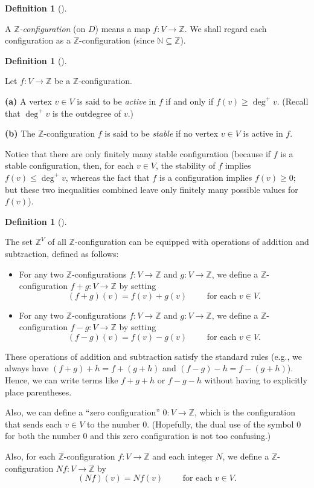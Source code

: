 \documentclass[numbers=enddot,12pt,final,onecolumn,notitlepage]{scrartcl}%
\theoremstyle{definition}
\newtheorem{defi}[theo]{Definition}
\newenvironment{definition}[1][]
{\begin{defi}[#1]\begin{leftbar}}
{\end{leftbar}\end{defi}}
\newcommand{\NN}{\mathbb{N}}
\newcommand{\ZZ}{\mathbb{Z}}
\newcommand{\tup}[1]{\left( #1 \right)}
\begin{document}
\begin{definition}
A \textit{$\ZZ$-configuration} (on $D$) means a map
$f : V \to \ZZ$.
We shall regard each configuration as a $\ZZ$-configuration
(since $\NN \subseteq \ZZ$).
\end{definition}

\begin{definition}
Let $f : V \to \ZZ$ be a $\ZZ$-configuration.

\textbf{(a)} A vertex $v \in V$ is said to be
\textit{active} in $f$ if and only if
$f\tup{v} \geq \deg^+ v$.
(Recall that $\deg^+ v$ is the outdegree of $v$.)

\textbf{(b)} The $\ZZ$-configuration $f$ is said to be
\textit{stable} if no vertex $v \in V$ is active in $f$.
\end{definition}

Notice that there are only finitely many stable configuration
(because if $f$ is a stable configuration, then, for each
$v \in V$, the stability of $f$ implies $f \tup{v} \leq \deg^+ v$,
whereas the fact that $f$ is a configuration implies
$f \tup{v} \geq 0$; but these two inequalities combined
leave only finitely many possible values for $f \tup{v}$).

\begin{definition} \label{def.chip.add-configs}
The set $\ZZ^V$ of all $\ZZ$-configuration can be equipped with
operations of addition and subtraction, defined as follows:

\begin{itemize}
 \item For any two $\ZZ$-configurations $f : V \to \ZZ$ and
       $g : V \to \ZZ$, we define a $\ZZ$-configuration
       $f + g : V \to \ZZ$ by setting
       \[
        \tup{f + g} \tup{v}
        = f \tup{v} + g \tup{v}
        \qquad \text{ for each } v \in V .
       \]

 \item For any two $\ZZ$-configurations $f : V \to \ZZ$ and
       $g : V \to \ZZ$, we define a $\ZZ$-configuration
       $f - g : V \to \ZZ$ by setting
       \[
        \tup{f - g} \tup{v}
        = f \tup{v} - g \tup{v}
        \qquad \text{ for each } v \in V .
       \]
\end{itemize}

These operations of addition and subtraction satisfy the
standard rules (e.g., we always have
$\tup{f+g} + h = f + \tup{g+h}$ and
$\tup{f-g} - h = f - \tup{g+h}$).
Hence, we can write terms like $f + g + h$ or $f - g - h$
without having to explicitly place parentheses.

Also, we can define a ``zero configuration'' $0 : V \to \ZZ$,
which is the configuration that sends each $v \in V$ to the
number $0$.
(Hopefully, the dual use of the symbol $0$ for both the number
$0$ and this zero configuration is not too confusing.)

Also, for each $\ZZ$-configuration $f : V \to \ZZ$ and each
integer $N$, we define a $\ZZ$-configuration $Nf : V \to \ZZ$
by
\[
\tup{Nf} \tup{v} = N f \tup{v}
\qquad \text{ for each } v \in V .
\]
\end{definition}
\end{document}

